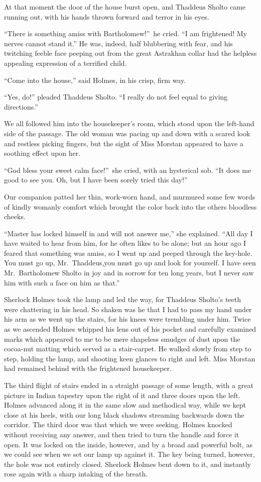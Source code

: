 \documentclass[12pt,english,oneside]{book}
\begin{document}
At that moment the door of the house burst open, and Thaddeus Sholto
came running out, with his hands thrown forward and terror in his
eyes.

{}``There is something amiss with Bartholomew!''\ he cried. {}``I
am frightened! My nerves cannot stand it.'' He was, indeed, half
blubbering with fear, and his twitching feeble face peeping out from
the great Astrakhan collar had the helpless appealing expression of
a terrified child.

{}``Come into the house,'' said Holmes, in his crisp, firm way.

{}``Yes, do!'' pleaded Thaddeus Sholto. {}``I really do not feel
equal to giving directions.''

We all followed him into the housekeeper's room, which stood upon
the left-hand side of the passage. The old woman was pacing up and
down with a scared look and restless picking fingers, but the sight
of Miss Morstan appeared to have a soothing effect upon her.

{}``God bless your sweet calm face!''\ she cried, with an hysterical
sob. {}``It does me good to see you. Oh, but I have been sorely tried
this day!''

Our companion patted her thin, work-worn hand, and murmured some few
words of kindly womanly comfort which brought the color back into
the others bloodless cheeks.

{}``Master has locked himself in and will not answer me,'' she explained.
{}``All day I have waited to hear from him, for he often likes to
be alone; but an hour ago I feared that something was amiss, so I
went up and peeped through the key-hole. You must go up, Mr.\ Thaddeus,\mdsh{---}you
must go up and look for yourself. I have seen Mr.\ Bartholomew Sholto
in joy and in sorrow for ten long years, but I never saw him with
such a face on him as that.''

Sherlock Holmes took the lamp and led the way, for Thaddeus Sholto's
teeth were chattering in his head. So shaken was he that I had to
pass my hand under his arm as we went up the stairs, for his knees
were trembling under him. Twice as we ascended Holmes whipped his
lens out of his pocket and carefully examined marks which appeared
to me to be mere shapeless smudges of dust upon the cocoa-nut matting
which served as a stair-carpet. He walked slowly from step to step,
holding the lamp, and shooting keen glances to right and left. Miss
Morstan had remained behind with the frightened housekeeper.

The third flight of stairs ended in a straight passage of some length,
with a great picture in Indian tapestry upon the right of it and three
doors upon the left. Holmes advanced along it in the same slow and
methodical way, while we kept close at his heels, with our long black
shadows streaming backwards down the corridor. The third door was
that which we were seeking. Holmes knocked without receiving any answer,
and then tried to turn the handle and force it open. It was locked
on the inside, however, and by a broad and powerful bolt, as we could
see when we set our lamp up against it. The key being turned, however,
the hole was not entirely closed. Sherlock Holmes bent down to it,
and instantly rose again with a sharp intaking of the breath.
\end{document}
